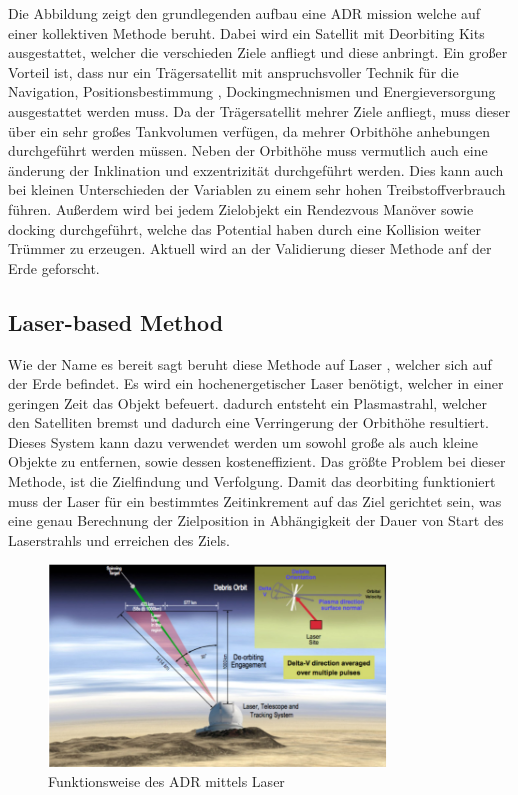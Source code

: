Die Abbildung zeigt den grundlegenden aufbau eine ADR mission welche auf einer kollektiven Methode beruht. Dabei wird ein Satellit mit Deorbiting Kits ausgestattet, welcher die verschieden Ziele anfliegt und diese anbringt. Ein großer Vorteil ist, dass nur ein Trägersatellit mit anspruchsvoller Technik für die Navigation, Positionsbestimmung , Dockingmechnismen und Energieversorgung ausgestattet werden muss. Da der Trägersatellit mehrer Ziele anfliegt, muss dieser über ein sehr großes Tankvolumen verfügen, da mehrer Orbithöhe anhebungen durchgeführt werden müssen. Neben der Orbithöhe muss vermutlich auch eine änderung der Inklination und exzentrizität durchgeführt werden. Dies kann auch bei kleinen Unterschieden der Variablen zu einem sehr hohen Treibstoffverbrauch führen. Außerdem wird bei jedem Zielobjekt ein Rendezvous Manöver sowie docking durchgeführt, welche das Potential haben durch eine Kollision weiter Trümmer zu erzeugen. Aktuell wird an der Validierung dieser Methode anf der Erde geforscht.

			\subsection{Laser-based Method}
Wie der Name es bereit sagt beruht diese Methode auf Laser , welcher sich auf der Erde befindet. Es wird ein hochenergetischer Laser benötigt, welcher in einer geringen Zeit das Objekt befeuert. dadurch entsteht ein Plasmastrahl, welcher den Satelliten bremst und dadurch eine Verringerung der Orbithöhe resultiert. Dieses System kann dazu verwendet werden um sowohl große als auch kleine Objekte zu entfernen, sowie dessen kosteneffizient. Das größte Problem bei dieser Methode, ist die Zielfindung und Verfolgung. Damit das deorbiting funktioniert muss der Laser für ein bestimmtes Zeitinkrement auf das Ziel gerichtet sein, was eine genau Berechnung der Zielposition in Abhängigkeit der Dauer von Start des Laserstrahls und erreichen des Ziels.
	
	\begin{figure}[h]
			\centering
					\includegraphics[width=0.80\textwidth]{./graphics/ADR/Laser-beam.PNG}
				\caption{Funktionsweise des ADR mittels Laser}
				\label{fig:Laser}
			\end{figure}


